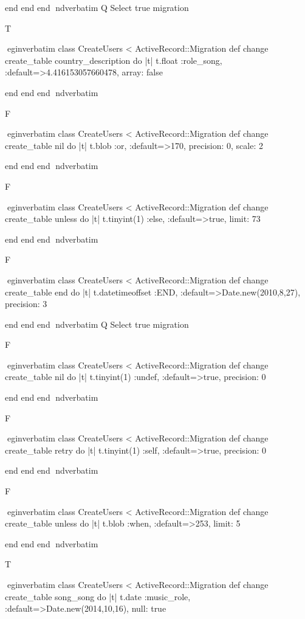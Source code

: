    end 
  end 
end
nd{verbatim}
Q
 Select true migration

T

egin{verbatim}
 class CreateUsers < ActiveRecord::Migration 
  def change 
    create_table country_description do |t| 
      t.float :role_song, :default=>4.416153057660478, array: false
    
    end 
  end 
end
nd{verbatim}

F

egin{verbatim}
 class CreateUsers < ActiveRecord::Migration 
  def change 
    create_table nil do |t| 
      t.blob :or, :default=>170, precision: 0, scale: 2
    
    end 
  end 
end
nd{verbatim}

F

egin{verbatim}
 class CreateUsers < ActiveRecord::Migration 
  def change 
    create_table unless do |t| 
      t.tinyint(1) :else, :default=>true, limit: 73
    
    end 
  end 
end
nd{verbatim}

F

egin{verbatim}
 class CreateUsers < ActiveRecord::Migration 
  def change 
    create_table end do |t| 
      t.datetimeoffset :END, :default=>Date.new(2010,8,27), precision: 3
    
    end 
  end 
end
nd{verbatim}
Q
 Select true migration

F

egin{verbatim}
 class CreateUsers < ActiveRecord::Migration 
  def change 
    create_table nil do |t| 
      t.tinyint(1) :undef, :default=>true, precision: 0
    
    end 
  end 
end
nd{verbatim}

F

egin{verbatim}
 class CreateUsers < ActiveRecord::Migration 
  def change 
    create_table retry do |t| 
      t.tinyint(1) :self, :default=>true, precision: 0
    
    end 
  end 
end
nd{verbatim}

F

egin{verbatim}
 class CreateUsers < ActiveRecord::Migration 
  def change 
    create_table unless do |t| 
      t.blob :when, :default=>253, limit: 5
    
    end 
  end 
end
nd{verbatim}

T

egin{verbatim}
 class CreateUsers < ActiveRecord::Migration 
  def change 
    create_table song_song do |t| 
      t.date :music_role, :default=>Date.new(2014,10,16), null: true
    
